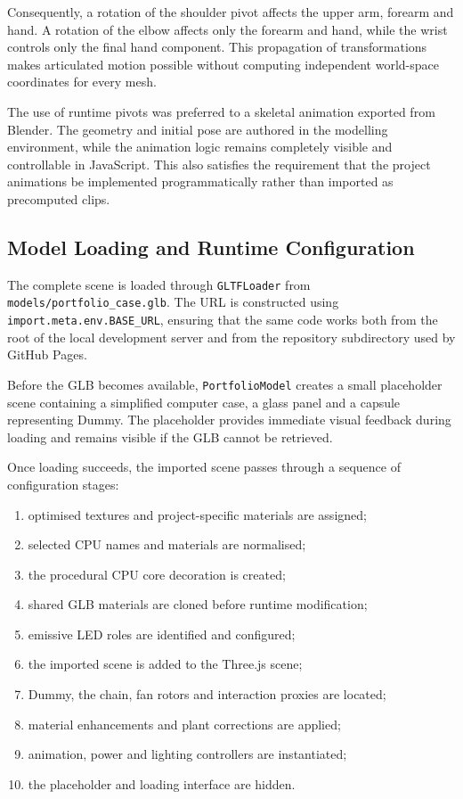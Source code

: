 \documentclass{report}
\begin{document}
Consequently, a rotation of the shoulder pivot affects the upper arm,
forearm and hand. A rotation of the elbow affects only the forearm and
hand, while the wrist controls only the final hand component. This
propagation of transformations makes articulated motion possible
without computing independent world-space coordinates for every mesh.

The use of runtime pivots was preferred to a skeletal animation exported
from Blender. The geometry and initial pose are authored in the modelling
environment, while the animation logic remains completely visible and
controllable in JavaScript. This also satisfies the requirement that the
project animations be implemented programmatically rather than imported
as precomputed clips.


\subsection{Model Loading and Runtime Configuration}

The complete scene is loaded through \texttt{GLTFLoader} from
\texttt{models/portfolio\_case.glb}. The URL is constructed using
\texttt{import.meta.env.BASE\_URL}, ensuring that the same code works
both from the root of the local development server and from the
repository subdirectory used by GitHub Pages.

Before the GLB becomes available, \texttt{PortfolioModel} creates a
small placeholder scene containing a simplified computer case, a glass
panel and a capsule representing Dummy. The placeholder provides
immediate visual feedback during loading and remains visible if the GLB
cannot be retrieved.

Once loading succeeds, the imported scene passes through a sequence of
configuration stages:

\begin{enumerate}
    \item optimised textures and project-specific materials are assigned;
    \item selected CPU names and materials are normalised;
    \item the procedural CPU core decoration is created;
    \item shared GLB materials are cloned before runtime modification;
    \item emissive LED roles are identified and configured;
    \item the imported scene is added to the Three.js scene;
    \item Dummy, the chain, fan rotors and interaction proxies are located;
    \item material enhancements and plant corrections are applied;
    \item animation, power and lighting controllers are instantiated;
    \item the placeholder and loading interface are hidden.
\end{enumerate}
\end{document}

